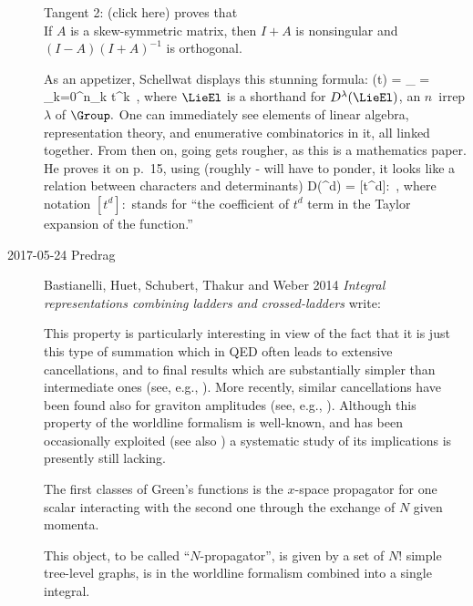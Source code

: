 \begin{description}
Tangent 2:  {(click here)}
proves that%
\\
If $A$ is a skew-symmetric matrix, then $I+A$ is nonsingular and
$(I-A)(I+A)^{-1}$ is orthogonal.

As an appetizer, Schellwat displays this stunning formula:
\beq
\Phi(t) =
 \sum_{\LieEl\in \Group} 
        = \sum_{k=0}^\infty n_k t^k
\,,
where $\LieEl$ is a shorthand for $D^\lambda(\LieEl)$, an $n$\dmn\ irrep $\lambda$
of $\Group.$
One can immediately see elements of linear algebra, representation theory, and
enumerative combinatorics in it, all linked together. From then on, going gets
rougher, as this is a mathematics paper. He proves it on p.~15, using (roughly -
will have to ponder, it looks like a relation between characters and determinants)
\beq
\tr D(\LieEl^d) =
[t^d]:
\,,
where notation $[t^d]:$ stands for ``the coefficient of $t^d$ term in the
Taylor expansion of the function.''


\item[2017-05-24 Predrag]
Bastianelli, Huet, Schubert, Thakur and Weber 2014
{\em Integral representations combining ladders and crossed-ladders}
write:

This property is particularly interesting in view of the fact that it is
just this type of summation which in QED often leads to extensive
cancellations, and to final results which are substantially simpler than
intermediate ones (see, e.g., ). More recently, similar
cancellations have been found also for graviton amplitudes (see, e.g.,
).
Although this property of the worldline formalism is well-known, and has
been occasionally exploited (see also
) a systematic study of its implications is
presently still lacking.

The first classes of Green's functions %
is the
$x$-space propagator for one scalar interacting with the second one
through the exchange of $N$ given momenta.

This object, to be called ``$N$-propagator'', is given by a set of $N!$
simple tree-level graphs, is in the worldline formalism combined into a
single integral.


\end{description}
